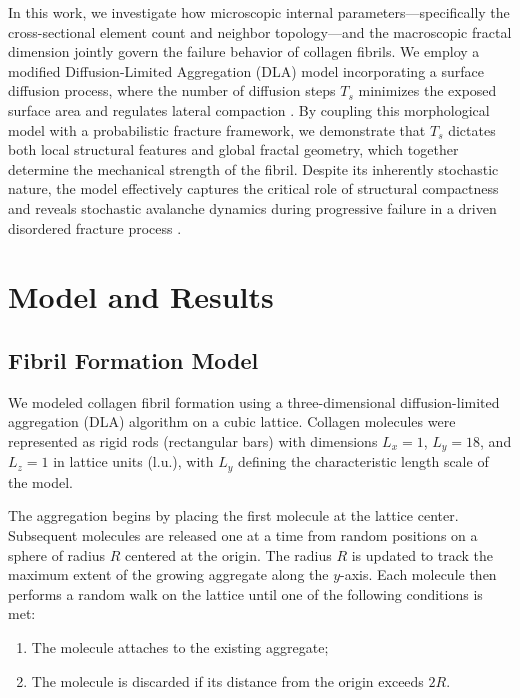 \documentclass[aps,physrev,preprint,groupedaddress,linenumbers]{revtex4-2}
\begin{document}
In this work, we investigate how microscopic internal parameters—specifically the cross-sectional element count and neighbor topology—and the macroscopic fractal dimension jointly govern the failure behavior of collagen fibrils. We employ a modified Diffusion-Limited Aggregation (DLA) model incorporating a surface diffusion process, where the number of diffusion steps $T_s$ minimizes the exposed surface area and regulates lateral compaction \cite{Parkinson1995}. By coupling this morphological model with a probabilistic fracture framework, we demonstrate that $T_s$ dictates both local structural features and global fractal geometry, which together determine the mechanical strength of the fibril. Despite its inherently stochastic nature, the model effectively captures the critical role of structural compactness and reveals stochastic avalanche dynamics during progressive failure in a driven disordered fracture process \cite{Zapperi1997a,Zapperi1999}.

\section{Model and Results}
\subsection{Fibril Formation Model}

We modeled collagen fibril formation using a three-dimensional diffusion-limited aggregation (DLA) algorithm on a cubic lattice. Collagen molecules were represented as rigid rods (rectangular bars) with dimensions $L_x = 1$, $L_y = 18$, and $L_z = 1$ in lattice units (l.u.), with $L_y$ defining the characteristic length scale of the model.

The aggregation begins by placing the first molecule at the lattice center. Subsequent molecules are released one at a time from random positions on a sphere of radius $R$ centered at the origin. The radius $R$ is updated to track the maximum extent of the growing aggregate along the $y$-axis. Each molecule then performs a random walk on the lattice until one of the following conditions is met:

\begin{enumerate}
	\item The molecule attaches to the existing aggregate;
	\item The molecule is discarded if its distance from the origin exceeds $2R$.
\end{enumerate}
\end{document}
